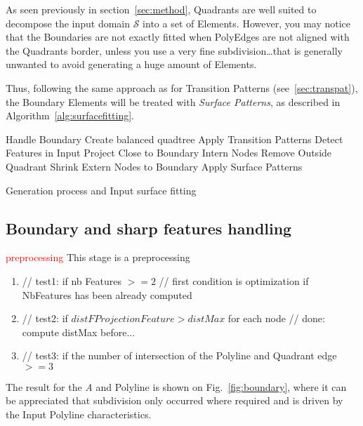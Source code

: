 \documentclass[10pt]{article}
\begin{document}
As seen previously in section~\ref{sec:method}, Quadrants are well suited to decompose the input  domain $\mathcal{S}$ into a set of Elements. However, you may notice that the Boundaries are not exactly fitted when PolyEdges are not aligned with the Quadrants border, unless you use a very fine subdivision\ldots that is generally unwanted to avoid generating a huge amount of Elements.

Thus, following the same approach as for Transition Patterns (see~\ref{sec:transpat}), the Boundary Elements will be treated with \textit{Surface Patterns}, as described in Algorithm~\ref{alg:surfacefitting}.\\

\begin{algorithm}[H]
%
\setcounter{AlgoLine}{-1}
\SetAlgoLined
{}
\nl   Handle Boundary\; \label{alg:bound2}
\nl {}
\nl Create balanced quadtree\; \label{alg:goto2}
 \nl Apply Transition Patterns\;
 \nl Detect Features in Input\;
 \nl  Project Close to Boundary Intern Nodes\; \label{alg:closeto2}
  \nl Remove Outside Quadrant\; \label{alg:remsur2}
  \nl Shrink Extern Nodes to Boundary\; \label{alg:shrink2}
 \nl Apply Surface Patterns\; \label{alg:surfpat2}
 \caption{Generation process and Input surface fitting}
 \label{alg:surfacefitting}
\end{algorithm}

\subsection{Boundary and sharp features handling}
\label{sec:boundary}

\textcolor{red}{preprocessing}
This stage is a preprocessing 

\begin{enumerate}
\item        // test1: if nb Features $>= 2$
        // first condition is optimization if NbFeatures has been already computed
\item        // test2: if $distFProjectionFeature > distMax$ for each node
        // done: compute distMax before...
\item        // test3: if the number of intersection of the Polyline and Quadrant edge $>= 3$
\end{enumerate}
The result for the \textit{A} and  Polyline is shown on Fig.~\ref{fig:boundary}, where it can be appreciated that subdivision only occurred where required and is driven by the Input Polyline characteristics.
\end{document}

